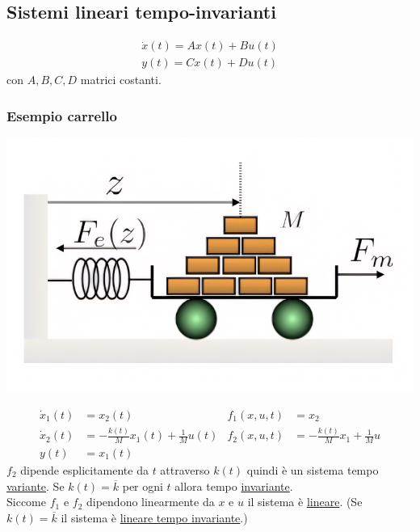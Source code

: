 \documentclass{article}
\begin{document}
\subsection{Sistemi lineari tempo-invarianti}
\begin{align*}
    \dot x(t) = A x(t) + B u(t)\\
    y(t) = C x(t) + D u(t)
\end{align*}
con $A,B,C,D$ matrici costanti.


\subsubsection{Esempio carrello}
\begin{center}
    \includegraphics[scale=0.2]{Images/Es_carrello.png}
\end{center}
\begin{align*}
    \dot x_1(t) &= x_2(t) & f_1(x,u,t) &= x_2\\
    \dot x_2(t) &= - \frac{k(t)}{M}x_1(t) + \frac{1}{M} u(t) & f_2(x,u,t) &= - \frac{k(t)}{M}x_1 + \frac{1}{M}u\\
    y(t) &= x_1(t)
\end{align*}
$f_2$ dipende esplicitamente da $t$ attraverso $k(t)$ quindi è un sistema tempo \underline{variante}. Se $k(t) = \overline{k}$ per ogni $t$ allora tempo \underline{invariante}.\\
Siccome $f_1$ e $f_2$ dipendono linearmente da $x$ e $u$ il sistema è \underline{lineare}. (Se $k(t) = \overline{k}$ il sistema è \underline{lineare tempo invariante}.)
\end{document}
